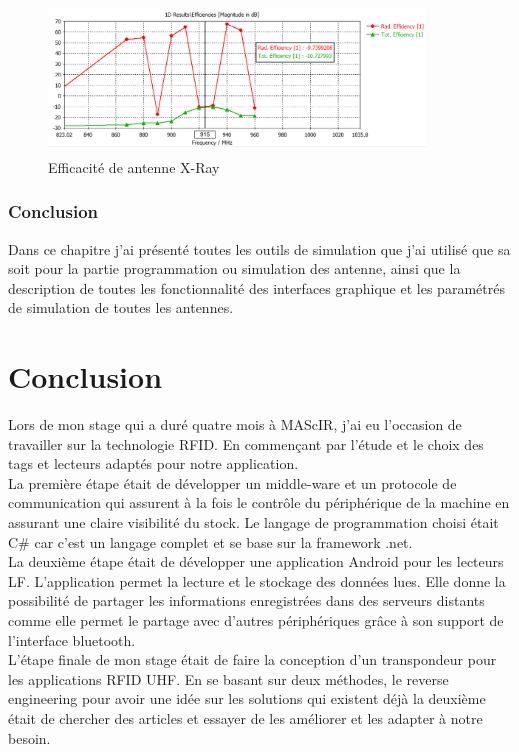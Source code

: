 \documentclass[11pt, a4paper, twoside]{book}
\begin{document}
\begin{figure}[H]
\centering
\includegraphics[width=10cm,height=4cm]{useeff}
\caption{Efficacité de antenne X-Ray}
\end{figure} 
\subsection{Conclusion}
Dans ce chapitre j'ai présenté toutes les outils de simulation  que j'ai utilisé  que sa soit pour la partie programmation ou simulation des antenne, ainsi que la description de toutes les fonctionnalité des interfaces graphique et  les paramétrés de  simulation de toutes les antennes.

\chapter*{Conclusion}
Lors de mon stage qui a duré quatre mois à MAScIR, j'ai eu l'occasion de travailler sur la technologie RFID. En commençant par l'étude et le choix des tags et lecteurs adaptés pour notre application.\\

La première étape était de développer un middle-ware et un protocole de communication qui assurent à la fois le contrôle du périphérique de la machine en assurant une claire visibilité du stock. Le langage de programmation choisi était C\# car c'est un langage complet et se base sur la framework .net.\\

La deuxième étape était de développer une application Android pour les lecteurs LF. L'application permet la lecture et le stockage des données lues. Elle donne la possibilité de partager les informations enregistrées dans des serveurs distants comme elle permet le partage avec d'autres périphériques grâce à son support de l'interface bluetooth.\\

L'étape finale  de mon stage était de faire la conception d'un transpondeur pour les applications RFID UHF. En se basant sur deux méthodes, le reverse engineering pour avoir une idée sur les solutions qui existent déjà  la deuxième était de chercher des articles et essayer de les améliorer et les adapter à notre besoin.\\
\end{document}
